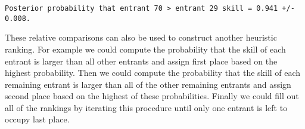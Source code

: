 \documentclass[
  letterpaper,
  DIV=11,
  numbers=noendperiod]{scrartcl}
\newenvironment{Shaded}{\begin{snugshade}}{\end{snugshade}}
\newcommand{\ControlFlowTok}[1]{\textcolor[rgb]{0.00,0.23,0.31}{#1}}
\newcommand{\DecValTok}[1]{\textcolor[rgb]{0.68,0.00,0.00}{#1}}
\newcommand{\FunctionTok}[1]{\textcolor[rgb]{0.28,0.35,0.67}{#1}}
\newcommand{\NormalTok}[1]{\textcolor[rgb]{0.00,0.23,0.31}{#1}}
\newcommand{\OtherTok}[1]{\textcolor[rgb]{0.00,0.23,0.31}{#1}}
\newcommand{\SpecialCharTok}[1]{\textcolor[rgb]{0.37,0.37,0.37}{#1}}
\newcommand{\StringTok}[1]{\textcolor[rgb]{0.13,0.47,0.30}{#1}}
\begin{document}
\begin{Shaded}
\end{Shaded}

\begin{verbatim}
Posterior probability that entrant 70 > entrant 29 skill = 0.941 +/- 0.008.
\end{verbatim}

These relative comparisons can also be used to construct another
heuristic ranking. For example we could compute the probability that the
skill of each entrant is larger than all other entrants and assign first
place based on the highest probability. Then we could compute the
probability that the skill of each remaining entrant is larger than all
of the other remaining entrants and assign second place based on the
highest of these probabilities. Finally we could fill out all of the
rankings by iterating this procedure until only one entrant is left to
occupy last place.
\end{document}
